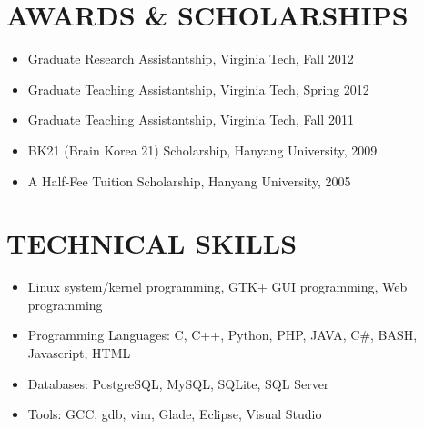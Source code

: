 \documentclass{res}
\begin{document}
\begin{resume}
\section{AWARDS \& SCHOLARSHIPS}
\vspace{0.2in}
 \begin{itemize}
  \item Graduate Research Assistantship, Virginia Tech, Fall 2012
  \item Graduate Teaching Assistantship, Virginia Tech, Spring 2012
  \item Graduate Teaching Assistantship, Virginia Tech, Fall 2011
  \item BK21 (Brain Korea 21) Scholarship, Hanyang University, 2009
  \item A Half-Fee Tuition Scholarship, Hanyang University, 2005
 \end{itemize}

\section{TECHNICAL SKILLS}
\vspace{0.2in}
 \begin{itemize}
  \item Linux system/kernel programming, GTK+ GUI programming, Web programming
  \item Programming Languages: C, C++, Python, PHP, JAVA, C\#, BASH, Javascript, HTML
  \item Databases: PostgreSQL, MySQL, SQLite, SQL Server
  \item Tools: GCC, gdb, vim, Glade, Eclipse, Visual Studio
 \end{itemize}
 
\end{resume}
\end{document}
